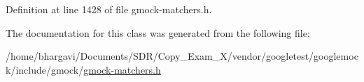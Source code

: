 Definition at line 1428 of file gmock-\/matchers.\+h.



The documentation for this class was generated from the following file\+:\begin{DoxyCompactItemize}
\item 
/home/bhargavi/\+Documents/\+S\+D\+R/\+Copy\+\_\+\+Exam\+\_\+X/vendor/googletest/googlemock/include/gmock/\hyperlink{gmock-matchers_8h}{gmock-\/matchers.\+h}\end{DoxyCompactItemize}
